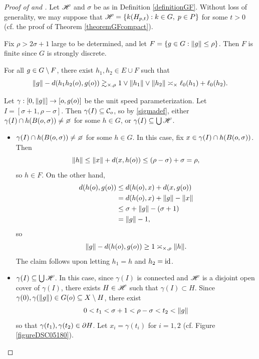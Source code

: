 \begin{proof}[Proof of  and ]
Let $\mathscr H$ and $\sigma$ be as in Definition \ref{definitionGF}. Without loss of generality, we may suppose that $\mathscr H = \{k(H_{p,t}) : k\in G,\; p\in P\}$ for some $t > 0$ (cf. the proof of Theorem \ref{theoremGFcompact}).

Fix $\rho > 2\sigma + 1$ large to be determined, and let $F = \{g\in G : \|g\| \leq \rho\}$. Then $F$ is finite since $G$ is strongly discrete.
\begin{claim}
\label{claimGcutF}
For all $g\in G\setminus F$, there exist $h_1,h_2\in E\cup F$ such that
\[
\|g\| - d(h_1 h_2(o),g(o)) \gtrsim_{\times,\rho} 1\vee \|h_1\|\vee \|h_2\| \asymp_\times \ell_0(h_1) + \ell_0(h_2).
\]
\end{claim}
\begin{subproof}
Let $\gamma:[0,\|g\|]\to [o,g(o)]$ be the unit speed parameterization. Let $I = [\sigma + 1,\rho - \sigma]$. Then $\gamma(I)\subseteq\mathcal C_o$, so by \eqref{sigmadef}, either $\gamma(I)\cap h(B(\zero,\sigma))\neq\emptyset$ for some $h\in G$, or $\gamma(I)\subseteq\bigcup\mathscr H$.

\begin{itemize}
\item[Case 1:] $\gamma(I) \cap h(B(\zero,\sigma)) \neq \emptyset$ for some $h\in G$. In this case, fix $x\in \gamma(I) \cap h(B(o,\sigma))$. Then
\[
\|h\| \leq \|x\| + d(x,h(o)) \leq (\rho - \sigma) + \sigma = \rho,
\]
so $h\in F$. On the other hand,
\begin{align*}
d(h(o),g(o)) &\leq d(h(o),x) + d(x, g(o)) \\
&= d(h(o),x) + \|g\| - \|x\|\\
&\leq \sigma + \|g\| - (\sigma + 1)\\
&= \|g\| - 1,
\end{align*}
so
\[
\|g\| - d(h(o),g(o)) \geq 1 \asymp_{\times,\rho} \|h\|.
\]
The claim follows upon letting $h_1 = h$ and $h_2 = \mathrm{id}$.

\item[Case 2:] $\gamma(I) \subseteq \bigcup\mathscr H$. In this case, since $\gamma(I)$ is connected and $\mathscr H$ is a disjoint open cover of $\gamma(I)$, there exists $H\in\mathscr H$ such that $\gamma(I) \subset H$. Since $\gamma(0),\gamma(\|g\|)\in G(o)\subseteq X\setminus H$, there exist
\[
0 < t_1 < \sigma + 1 < \rho - \sigma < t_2 < \|g\|
\]
so that $\gamma(t_1),\gamma(t_2)\in\partial H$. Let $x_i = \gamma(t_i)$ for $i = 1,2$ (cf. Figure \ref{figureDSC05180}).%


\end{itemize}
\end{subproof}
\end{proof}
